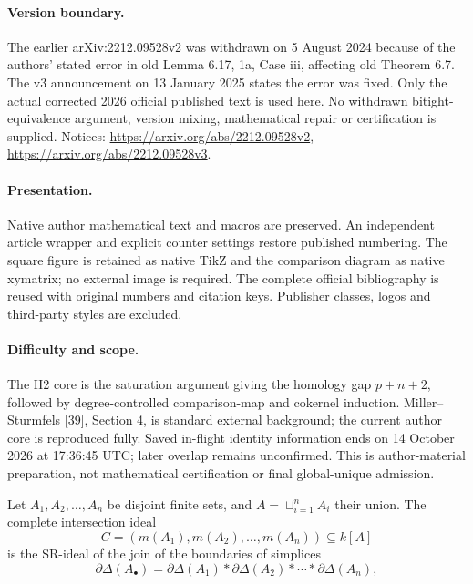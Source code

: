\documentclass[10pt,a4paper]{article}
\theoremstyle{definition}
\theoremstyle{remark}
\theoremstyle{plain}
\newcommand{\pd}{\partial}
\newcommand{\vardel}{\partial}
\newcommand{\sus}{\subseteq}
\newcommand{\Ab}{A_\bullet}
\newcommand{\Delst}{\vardel \Delta}
\begin{document}
\paragraph{Version boundary.} The earlier arXiv:2212.09528v2 was withdrawn on 5 August 2024 because of the authors' stated error in old Lemma 6.17, 1a, Case iii, affecting old Theorem 6.7. The v3 announcement on 13 January 2025 states the error was fixed. Only the actual corrected 2026 official published text is used here. No withdrawn bitight-equivalence argument, version mixing, mathematical repair or certification is supplied. Notices: \url{https://arxiv.org/abs/2212.09528v2}, \url{https://arxiv.org/abs/2212.09528v3}.

\paragraph{Presentation.} Native author mathematical text and macros are preserved. An independent article wrapper and explicit counter settings restore published numbering. The square figure is retained as native TikZ and the comparison diagram as native xymatrix; no external image is required. The complete official bibliography is reused with original numbers and citation keys. Publisher classes, logos and third-party styles are excluded.

\paragraph{Difficulty and scope.} The H2 core is the saturation argument giving the homology gap $p+n+2$, followed by degree-controlled comparison-map and cokernel induction. Miller--Sturmfels [39], Section 4, is standard external background; the current author core is reproduced fully. Saved in-flight identity information ends on 14 October 2026 at 17:36:45 UTC; later overlap remains unconfirmed. This is author-material preparation, not mathematical certification or final global-unique admission.

\setcounter{section}{3}\setcounter{equation}{3}

Let  $A_1, A_2, \ldots, A_n$ be disjoint finite sets, and $A = \sqcup_{i=1}^n A_i$
their union. The complete intersection ideal
\begin{equation*}
  C = (m(A_1), m(A_2), \ldots, m(A_n))  \sus k[A]
\end{equation*}
is the SR-ideal of the join
of the boundaries of simplices
\begin{equation} \label{eq:liaison-join}
  \Delst(\Ab) = \pd \Delta(A_1) * \pd \Delta(A_2) * \cdots * \pd \Delta(A_n),
 \end{equation}
\end{document}
